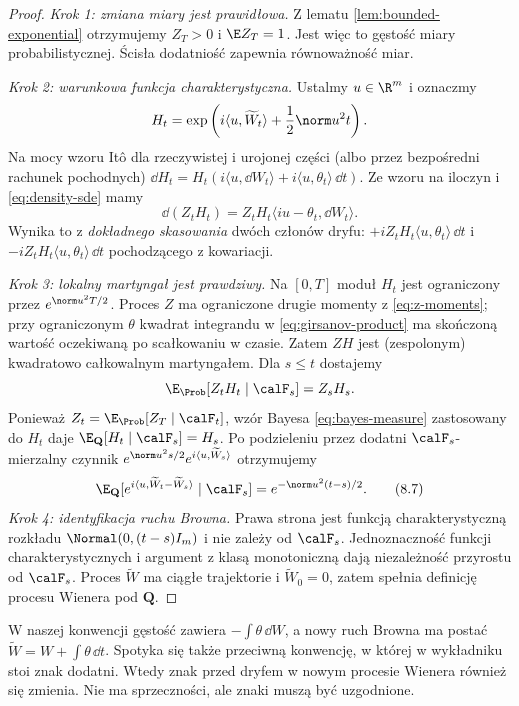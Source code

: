 \begin{proof}
\emph{Krok 1: zmiana miary jest prawidłowa.}
Z lematu \ref{lem:bounded-exponential} otrzymujemy
$Z_T>0$ i $\E Z_T=1$. Jest więc to gęstość miary
probabilistycznej. Ścisła dodatniość zapewnia
równoważność miar.

\emph{Krok 2: warunkowa funkcja charakterystyczna.}
Ustalmy $u\in\R^m$ i oznaczmy
\[
H_t=\exp\left(i\langle u,\widetilde W_t\rangle
                    +\frac12\norm u^2t\right).
\]
Na mocy wzoru Itô dla rzeczywistej i urojonej
części (albo przez bezpośredni rachunek pochodnych)
$\dd H_t=H_t(i\langle u,\dd W_t\rangle
+i\langle u,\theta_t\rangle\,\dd t)$.
Ze wzoru na iloczyn i \eqref{eq:density-sde} mamy
\[
\dd(Z_tH_t)=Z_tH_t\langle iu-\theta_t,\dd W_t\rangle.
\tag{8.6}\label{eq:girsanov-product}
\]
Wynika to z \emph{dokładnego skasowania} dwóch
członów dryfu: $+iZ_tH_t\langle u,\theta_t\rangle\,\dd t$
i $-iZ_tH_t\langle u,\theta_t\rangle\,\dd t$
pochodzącego z kowariacji.

\emph{Krok 3: lokalny martyngał jest prawdziwy.}
Na $[0,T]$ moduł $H_t$ jest ograniczony przez
$e^{\norm u^2T/2}$. Proces $Z$ ma ograniczone
drugie momenty z \eqref{eq:z-moments}; przy
ograniczonym $\theta$ kwadrat integrandu w
\eqref{eq:girsanov-product} ma skończoną wartość
oczekiwaną po scałkowaniu w czasie. Zatem $ZH$
jest (zespolonym) kwadratowo całkowalnym martyngałem.
Dla $s\le t$ dostajemy
\[
\E_{\Prob}[Z_tH_t\mid\calF_s]=Z_sH_s.
\]
Ponieważ $Z_t=\E_{\Prob}[Z_T\mid\calF_t]$,
wzór Bayesa \eqref{eq:bayes-measure} zastosowany do
$H_t$ daje $\E_{\mathbf Q}[H_t\mid\calF_s]=H_s$.
Po podzieleniu przez dodatni $\calF_s$-mierzalny
czynnik $e^{\norm u^2s/2}e^{i\langle u,\widetilde W_s\rangle}$
otrzymujemy
\[
\E_{\mathbf Q}[e^{i\langle u,\widetilde W_t-\widetilde W_s\rangle}
\mid\calF_s]
=e^{-\norm u^2(t-s)/2}.
\tag{8.7}\label{eq:girsanov-char}
\]
\emph{Krok 4: identyfikacja ruchu Browna.}
Prawa strona jest funkcją charakterystyczną rozkładu
$\Normal(0,(t-s)I_m)$ i nie zależy od $\calF_s$.
Jednoznaczność funkcji charakterystycznych i
argument z klasą monotoniczną dają niezależność
przyrostu od $\calF_s$. Proces $\widetilde W$ ma
ciągłe trajektorie i $\widetilde W_0=0$, zatem
spełnia definicję procesu Wienera pod $\mathbf Q$.
\end{proof}

\begin{uwaga}
W naszej konwencji gęstość zawiera
$-\int\theta\,\dd W$, a nowy ruch Browna ma postać
$\widetilde W=W+\int\theta\,\dd t$.
Spotyka się także przeciwną konwencję, w której
w wykładniku stoi znak dodatni. Wtedy znak przed
dryfem w nowym procesie Wienera również się zmienia.
Nie ma sprzeczności, ale znaki muszą być uzgodnione.
\end{uwaga}

